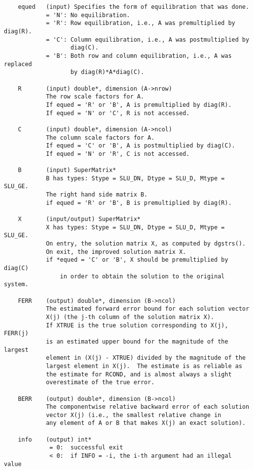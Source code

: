 \begin{verbatim}
    equed   (input) Specifies the form of equilibration that was done.
            = 'N': No equilibration.
            = 'R': Row equilibration, i.e., A was premultiplied by diag(R).
            = 'C': Column equilibration, i.e., A was postmultiplied by
                   diag(C).
            = 'B': Both row and column equilibration, i.e., A was replaced 
                   by diag(R)*A*diag(C).
 
    R       (input) double*, dimension (A->nrow)
            The row scale factors for A.
            If equed = 'R' or 'B', A is premultiplied by diag(R).
            If equed = 'N' or 'C', R is not accessed.
  
    C       (input) double*, dimension (A->ncol)
            The column scale factors for A.
            If equed = 'C' or 'B', A is postmultiplied by diag(C).
            If equed = 'N' or 'R', C is not accessed.
 
    B       (input) SuperMatrix*
            B has types: Stype = SLU_DN, Dtype = SLU_D, Mtype = SLU_GE.
            The right hand side matrix B.
            if equed = 'R' or 'B', B is premultiplied by diag(R).
 
    X       (input/output) SuperMatrix*
            X has types: Stype = SLU_DN, Dtype = SLU_D, Mtype = SLU_GE.
            On entry, the solution matrix X, as computed by dgstrs().
            On exit, the improved solution matrix X.
            if *equed = 'C' or 'B', X should be premultiplied by diag(C)
                in order to obtain the solution to the original system.
 
    FERR    (output) double*, dimension (B->ncol)   
            The estimated forward error bound for each solution vector   
            X(j) (the j-th column of the solution matrix X).   
            If XTRUE is the true solution corresponding to X(j), FERR(j) 
            is an estimated upper bound for the magnitude of the largest 
            element in (X(j) - XTRUE) divided by the magnitude of the   
            largest element in X(j).  The estimate is as reliable as   
            the estimate for RCOND, and is almost always a slight   
            overestimate of the true error.
 
    BERR    (output) double*, dimension (B->ncol)   
            The componentwise relative backward error of each solution   
            vector X(j) (i.e., the smallest relative change in   
            any element of A or B that makes X(j) an exact solution).
 
    info    (output) int*   
             = 0:  successful exit   
             < 0:  if INFO = -i, the i-th argument had an illegal value   
 
\end{verbatim}

